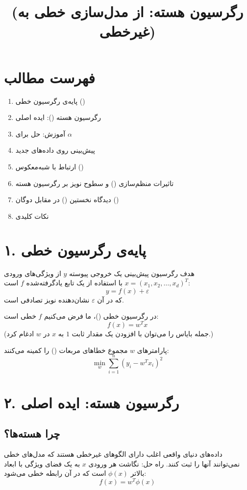 \documentclass{article}
\title{\lr{Kernel Regression: From Linear to Nonlinear Modeling} \\ (رگرسیون هسته: از مدل‌سازی خطی به غیرخطی)}
\author{}
\date{}
\begin{document}
\maketitle

\section*{فهرست مطالب}
\begin{enumerate}
    \item پایه‌ی رگرسیون خطی ()
    \item رگرسیون هسته (): ایده اصلی
    \item آموزش: حل برای $\alpha$
    \item پیش‌بینی روی داده‌های جدید
    \item ارتباط با شبه‌معکوس ()
    \item تاثیرات منظم‌سازی () و سطوح نویز بر رگرسیون هسته
    \item دیدگاه نخستین () در مقابل دوگان ()
    \item نکات کلیدی
\end{enumerate}

\newpage

\section*{۱. پایه‌ی رگرسیون خطی}
هدف رگرسیون پیش‌بینی یک خروجی پیوسته $y$ از ویژگی‌های ورودی $x=(x_1, x_2, \dots, x_d)^T$ با استفاده از یک تابع یادگرفته‌شده $f$ است:
\[
y = f(x) + \varepsilon
\]
که در آن $\varepsilon$ نشان‌دهنده نویز تصادفی است.

در رگرسیون خطی ()، ما فرض می‌کنیم $f$ خطی است:
\[
f(x) = w^T x
\]
(جمله بایاس را می‌توان با افزودن یک مقدار ثابت $1$ به $x$ در $w$ ادغام کرد.)

پارامترهای $w$ مجموع خطاهای مربعات () را کمینه می‌کنند:
\[
\min_{w} \sum_{i=1}^{n} (y_i - w^T x_i)^2
\]

\section*{۲. رگرسیون هسته: ایده اصلی}

\subsection*{چرا هسته‌ها؟}
داده‌های دنیای واقعی اغلب دارای الگوهای غیرخطی هستند که مدل‌های خطی نمی‌توانند آنها را ثبت کنند. راه حل: نگاشت هر ورودی $x$ به یک فضای ویژگی با ابعاد بالاتر $\phi(x)$ است که در آن رابطه خطی می‌شود:
\[
f(x) = w^T \phi(x)
\]
\end{document}
